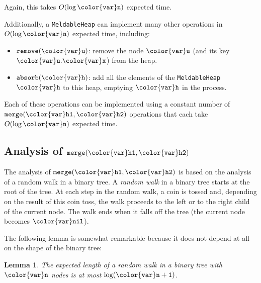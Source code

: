 \documentclass[10pt]{book}
\theoremstyle{plain}
\newtheorem{lem}{Lemma}[chapter]
\newcommand{\lemlabel}[1]{\label{lem:#1}}
\theoremstyle{definition}
\begin{document}
Again, this takes $O(\log \ensuremath{\mathtt{{\color{var}n}}})$ expected time.

Additionally, a \texttt{MeldableHeap} can implement many other operations in
$O(\log \ensuremath{\mathtt{{\color{var}n}}})$ expected time, including:
\begin{itemize}
\item \ensuremath{\mathtt{remove({\color{var}u})}}: remove the node \ensuremath{\mathtt{{\color{var}u}}} (and its key \ensuremath{\mathtt{{\color{var}u}.{\color{var}x}}}) from the heap.
\item \ensuremath{\mathtt{absorb({\color{var}h})}}: add all the elements of the \texttt{MeldableHeap} \ensuremath{\mathtt{{\color{var}h}}} to this heap, emptying \ensuremath{\mathtt{{\color{var}h}}} in the process.
\end{itemize}
Each of these operations can be implemented using a constant number of
\ensuremath{\mathtt{merge({\color{var}h1},{\color{var}h2})}} operations that each take $O(\log \ensuremath{\mathtt{{\color{var}n}}})$ expected time.

\subsection{Analysis of \ensuremath{\mathtt{merge({\color{var}h1},{\color{var}h2})}}}

The analysis of \ensuremath{\mathtt{merge({\color{var}h1},{\color{var}h2})}} is based on the analysis of a random walk
in a binary tree.  A \emph{random walk} in a binary tree starts at the
root of the tree.  At each step in the random walk, a coin is tossed and,
depending on the result of this coin toss, the walk proceeds to the left
or to the right child of the current node.  The walk ends when it falls
off the tree (the current node becomes \ensuremath{\mathtt{{\color{var}nil}}}).

The following lemma is somewhat remarkable because it does not depend
at all on the shape of the binary tree:

\begin{lem}\lemlabel{tree-random-walk}
The expected length of a random walk in a binary tree with \ensuremath{\mathtt{{\color{var}n}}} nodes is at most \ensuremath{\mathtt{\log ({\color{var}n}+1)}}.
\end{lem}
\end{document}
